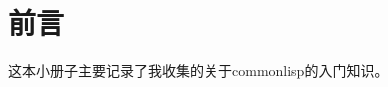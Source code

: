 \documentclass[11pt,oneside]{book}
\begin{document}
\frontmatter

\author{万泽}
\titleLB

\chapter*{前言}
\begin{common-format}
这本小册子主要记录了我收集的关于commonlisp的入门知识。


\end{common-format}


\setcounter{tocdepth}{2}
\tableofcontents
\end{document}
